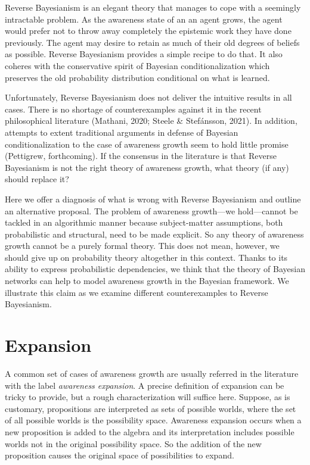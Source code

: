 \documentclass[
  11pt,
  dvipsnames,enabledeprecatedfontcommands]{scrartcl}
\begin{document}
Reverse Bayesianism is an elegant theory that manages to cope with a
seemingly intractable problem. As the awareness state of an an agent
grows, the agent would prefer not to throw away completely the epistemic
work they have done previously. The agent may desire to retain as much
of their old degrees of beliefs as possible. Reverse Bayesianism
provides a simple recipe to do that. It also coheres with the
conservative spirit of Bayesian conditionalization which preserves the
old probability distribution conditional on what is learned.

Unfortunately, Reverse Bayesianism does not deliver the intuitive
results in all cases. There is no shortage of counterexamples against it
in the recent philosophical literature (Mathani, 2020; Steele \&
Stefánsson, 2021). In addition, attempts to extent traditional arguments
in defense of Bayesian conditionalization to the case of awareness
growth seem to hold little promise (Pettigrew, forthcoming). If the
consensus in the literature is that Reverse Bayesianism is not the right
theory of awareness growth, what theory (if any) should replace it?

Here we offer a diagnosis of what is wrong with Reverse Bayesianism and
outline an alternative proposal. The problem of awareness growth---we
hold---cannot be tackled in an algorithmic manner because subject-matter
assumptions, both probabilistic and structural, need to be made
explicit. So any theory of awareness growth cannot be a purely formal
theory. This does not mean, however, we should give up on probability
theory altogether in this context. Thanks to its ability to express
probabilistic dependencies, we think that the theory of Bayesian
networks can help to model awareness growth in the Bayesian framework.
We illustrate this claim as we examine different counterexamples to
Reverse Bayesianism.

\hypertarget{expansion}{%
\section{Expansion}\label{expansion}}

A common set of cases of awareness growth are usually referred in the
literature with the label \emph{awareness expansion}. A precise
definition of expansion can be tricky to provide, but a rough
characterization will suffice here. Suppose, as is customary,
propositions are interpreted as sets of possible worlds, where the set
of all possible worlds is the possibility space. Awareness expansion
occurs when a new proposition is added to the algebra and its
interpretation includes possible worlds not in the original possibility
space. So the addition of the new proposition causes the original space
of possibilities to expand.
\end{document}
